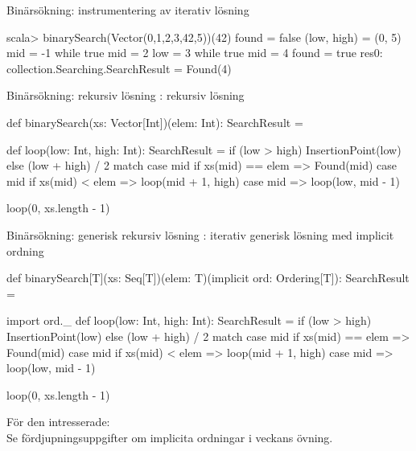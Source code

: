 \begin{Slide}{Binärsökning: instrumentering av iterativ lösning}
\vspace{-0.5em}
\vspace{-0.5em}
\begin{REPL}[basicstyle=\color{white}\ttfamily\SlideFontSize{6}{7}]
scala> binarySearch(Vector(0,1,2,3,42,5))(42)
found = false
(low, high) = (0, 5)
mid = -1
while true
mid = 2
low = 3
while true
mid = 4
found = true
res0: collection.Searching.SearchResult = Found(4)
\end{REPL}
\end{Slide}

\begin{Slide}{Binärsökning: rekursiv lösning}
: rekursiv lösning
\begin{Code}
def binarySearch(xs: Vector[Int])(elem: Int): SearchResult = {
  def loop(low: Int, high: Int): SearchResult = 
    if (low > high) InsertionPoint(low) 
    else (low + high) / 2 match {
      case mid if xs(mid) == elem => Found(mid)
      case mid if xs(mid) < elem  => loop(mid + 1, high)
      case mid                    => loop(low, mid - 1)
    }
    
  loop(0, xs.length - 1) 
}
\end{Code}
\end{Slide}


\begin{Slide}{Binärsökning: generisk rekursiv lösning}
: iterativ generisk lösning med implicit ordning
\begin{CodeSmall}
def binarySearch[T](xs: Seq[T])(elem: T)(implicit ord: Ordering[T]): SearchResult = {
  import ord._
  def loop(low: Int, high: Int): SearchResult = 
    if (low > high) InsertionPoint(low) 
    else (low + high) / 2 match {
      case mid if xs(mid) == elem => Found(mid)
      case mid if xs(mid) < elem  => loop(mid + 1, high)
      case mid                    => loop(low, mid - 1)
    }
    
  loop(0, xs.length - 1) 
}
\end{CodeSmall}
{\SlideFontSmall För den intresserade:\\Se fördjupningsuppgifter om implicita ordningar i veckans övning.}
\end{Slide}

